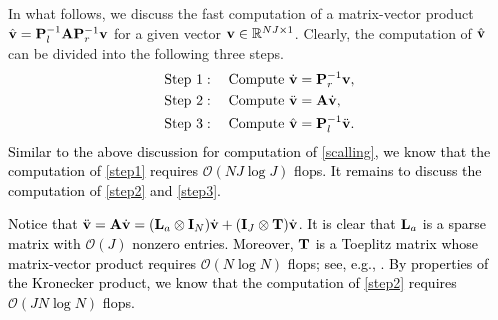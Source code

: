 \documentclass[11pt]{article}%
\numberwithin{equation}{section}
\begin{document}
In what follows, we discuss the fast computation of a matrix-vector product $\hat{\bf v}={\bf P}_l^{-1}{\bf A}{\bf P}_r^{-1}{\bf v}$ for a given vector ${\bf v}\in\mathbb{R}^{NJ\times 1}$. Clearly, the computation of $\hat{\bf v}$ can be divided into the following three steps.
\begin{align}
&{\rm Step~1}: \quad  {\rm Compute~}\dot{\bf v}={\bf P}_r^{-1}{\bf v},\label{step1}\\
&{\rm Step~2}: \quad  {\rm Compute~} \ddot{\bf v}={\bf A}\dot{\bf v},\label{step2}\\
&{\rm Step~3}: \quad  {\rm Compute~}\hat{\bf v}={\bf P}_l^{-1}\ddot{\bf v}.\label{step3}
\end{align}
\textcolor{black}{Similar to the above discussion for computation of \eqref{scalling}, we know that the computation of \eqref{step1} requires $\mathcal{O}(NJ\log J)$ flops. It remains to discuss the computation of \eqref{step2} and \eqref{step3}.}

\textcolor{black}{Notice that $\ddot{\bf v}={\bf A}\dot{\bf v}=({\bf L}_a\otimes{\bf I}_N)\dot{\bf v}+({\bf I}_J\otimes{\bf T})\dot{\bf v}$. It is clear that ${\bf L}_a$ is a sparse matrix with $\mathcal{O}(J)$ nonzero entries. Moreover, ${\bf T}$ is a Toeplitz matrix  whose matrix-vector product requires $\mathcal{O}(N\log N)$ flops; see, e.g., \cite{mng2004}. By properties of the Kronecker product, we know that the computation of \eqref{step2} requires $\mathcal{O}(JN\log N)$ flops.}
\end{document}
